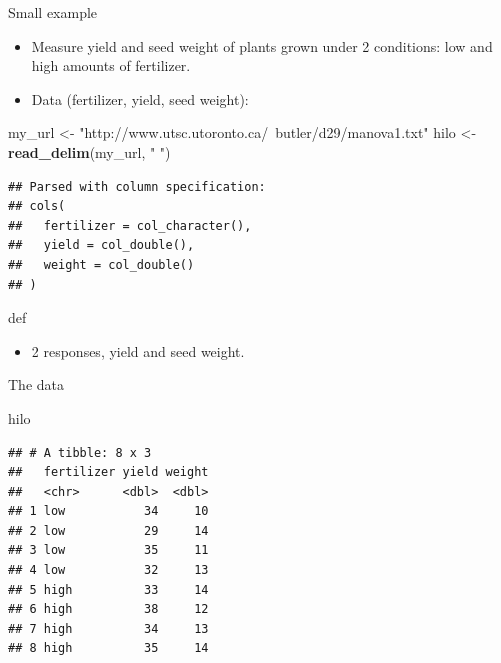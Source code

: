 \documentclass[ignorenonframetext,]{beamer}
\newenvironment{Shaded}{\begin{snugshade}}{\end{snugshade}}
\newcommand{\KeywordTok}[1]{\textcolor[rgb]{0.13,0.29,0.53}{\textbf{#1}}}
\newcommand{\NormalTok}[1]{#1}
\newcommand{\StringTok}[1]{\textcolor[rgb]{0.31,0.60,0.02}{#1}}
\providecommand{\tightlist}{%
  \setlength{\itemsep}{0pt}\setlength{\parskip}{0pt}}
\begin{document}
\begin{frame}[fragile]{Small example}
\protect\hypertarget{small-example}{}

\begin{itemize}
\item
  Measure yield and seed weight of plants grown under 2 conditions: low
  and high amounts of fertilizer.
\item
  Data (fertilizer, yield, seed weight):
\end{itemize}

\begin{Shaded}
\begin{Highlighting}[]
\NormalTok{my_url <-}\StringTok{ "http://www.utsc.utoronto.ca/~butler/d29/manova1.txt"}
\NormalTok{hilo <-}\StringTok{ }\KeywordTok{read_delim}\NormalTok{(my_url, }\StringTok{" "}\NormalTok{)}
\end{Highlighting}
\end{Shaded}

\begin{verbatim}
## Parsed with column specification:
## cols(
##   fertilizer = col_character(),
##   yield = col_double(),
##   weight = col_double()
## )
\end{verbatim}

def

\begin{itemize}
\tightlist
\item
  2 responses, yield and seed weight.
\end{itemize}

\end{frame}

\begin{frame}[fragile]{The data}
\protect\hypertarget{the-data-9}{}

\begin{Shaded}
\begin{Highlighting}[]
\NormalTok{hilo}
\end{Highlighting}
\end{Shaded}

\begin{verbatim}
## # A tibble: 8 x 3
##   fertilizer yield weight
##   <chr>      <dbl>  <dbl>
## 1 low           34     10
## 2 low           29     14
## 3 low           35     11
## 4 low           32     13
## 5 high          33     14
## 6 high          38     12
## 7 high          34     13
## 8 high          35     14
\end{verbatim}

\end{frame}
\end{document}
